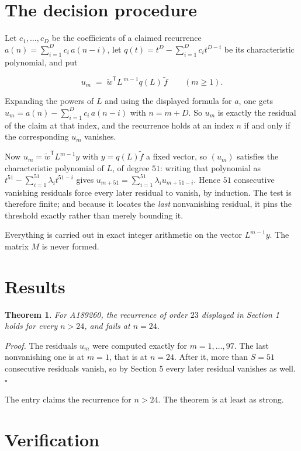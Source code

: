 \documentclass[11pt]{article}
\newtheorem{theorem}{Theorem}
\theoremstyle{definition}
\begin{document}
\section{The decision procedure}

Let $c_1,\dots,c_D$ be the coefficients of a claimed recurrence $a(n) = \sum_{i=1}^{D} c_i\,a(n-i)$, let $q(t) = t^{D} - \sum_{i=1}^{D} c_i t^{D-i}$ be its characteristic polynomial, and put

\[u_m \;=\; \tilde w^{\mathsf T} L^{\,m-1} q(L)\,\tilde f \qquad (m \ge 1).\]

Expanding the powers of $L$ and using the displayed formula for $a$, one gets $u_m = a(n) - \sum_{i=1}^{D} c_i\,a(n-i)$ with $n = m + D$. So $u_m$ is exactly the residual of the claim at that index, and the recurrence holds at an index $n$ if and only if the corresponding $u_m$ vanishes.

Now $u_m = \tilde w^{\mathsf T} L^{m-1} y$ with $y = q(L)\tilde f$ a fixed vector, so $(u_m)$ satisfies the characteristic polynomial of $L$, of degree $51$: writing that polynomial as $t^{51} - \sum_{i=1}^{51} \lambda_i t^{51-i}$ gives $u_{m+51} = \sum_{i=1}^{51} \lambda_i u_{m+51-i}$. Hence $51$ consecutive vanishing residuals force every later residual to vanish, by induction. The test is therefore finite; and because it locates the {\itshape last} nonvanishing residual, it pins the threshold exactly rather than merely bounding it.

Everything is carried out in exact integer arithmetic on the vector $L^{m-1}y$. The matrix $M$ is never formed.

\section{Results}

\begin{theorem} For A189260, the recurrence of order $23$ displayed in Section 1 holds for every $n > 24$, and fails at $n = 24$.\end{theorem}

{\itshape Proof.} The residuals $u_m$ were computed exactly for $m = 1,\dots,97$. The last nonvanishing one is at $m = 1$, that is at $n = 24$. After it, more than $S = 51$ consecutive residuals vanish, so by Section 5 every later residual vanishes as well. $\square$

The entry claims the recurrence for $n > 24$. The theorem is at least as strong.

\section{Verification}
\end{document}
